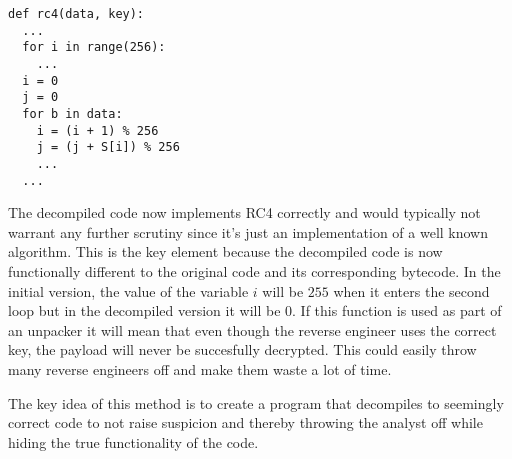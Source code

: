 \documentclass[twocolumn]{article}
\begin{document}
\begin{verbatim}
def rc4(data, key):
  ...
  for i in range(256):
    ...
  i = 0
  j = 0
  for b in data:
    i = (i + 1) % 256
    j = (j + S[i]) % 256
    ...
  ...
\end{verbatim}

The decompiled code now implements RC4 correctly and would typically not warrant any further scrutiny since it's just an implementation of a well known algorithm. This is the key element because the decompiled code is now functionally different to the original code and its corresponding bytecode. In the initial version, the value of the variable $i$ will be $255$ when it enters the second loop but in the decompiled version it will be $0$. If this function is used as part of an unpacker it will mean that even though the reverse engineer uses the correct key, the payload will never be succesfully decrypted. This could easily throw many reverse engineers off and make them waste a lot of time.

The key idea of this method is to create a program that decompiles to seemingly correct code to not raise suspicion and thereby throwing the analyst off while hiding the true functionality of the code.


\end{document}
